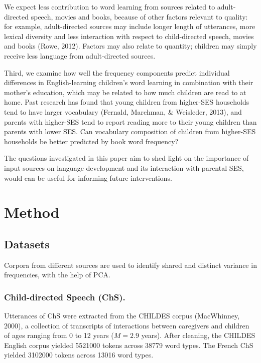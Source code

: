 \documentclass[10pt, letterpaper]{article}
\begin{document}
We expect less contribution to word learning from sources related to
adult-directed speech, movies and books, because of other factors
relevant to quality: for example, adult-directed sources may include
longer length of utterances, more lexical diversity and less interaction
with respect to child-directed speech, movies and books (Rowe, 2012).
Factors may also relate to quantity; children may simply receive less
language from adult-directed sources.

Third, we examine how well the frequency components predict individual
differences in English-learning children's word learning in combination
with their mother's education, which may be related to how much children
are read to at home. Past research has found that young children from
higher-SES households tend to have larger vocabulary (Fernald, Marchman,
\& Weisleder, 2013), and parents with higher-SES tend to report reading
more to their young children than parents with lower SES. Can vocabulary
composition of children from higher-SES households be better predicted
by book word frequency?

The questions investigated in this paper aim to shed light on the
importance of input sources on language development and its interaction
with parental SES, would can be useful for informing future
interventions.

\hypertarget{method}{%
\section{Method}\label{method}}

\hypertarget{datasets}{%
\subsection{Datasets}\label{datasets}}

Corpora from different sources are used to identify shared and distinct
variance in frequencies, with the help of PCA.

\hypertarget{child-directed-speech-chs.}{%
\subsubsection{Child-directed Speech
(ChS).}\label{child-directed-speech-chs.}}

Utterances of ChS were extracted from the CHILDES corpus (MacWhinney,
2000), a collection of transcripts of interactions between caregivers
and children of ages ranging from 0 to 12 years (\(M=2.9\) years). After
cleaning, the CHILDES English corpus yielded 5521000 tokens across 38779
word types. The French ChS yielded 3102000 tokens across 13016 word
types.
\end{document}
